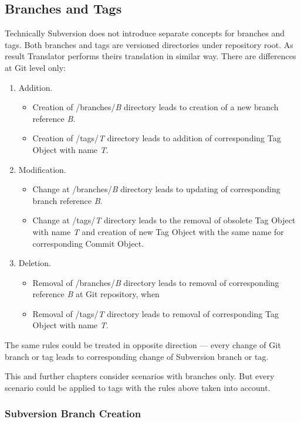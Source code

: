 \subsection{Branches and Tags}

Technically Subversion does not introduce separate concepts for branches and tags. Both branches and tags are versioned directories under repository root. As result Translator performs theirs translation in similar way. There are differences at Git level only:
\begin{enumerate}
	\compactlist
	\item Addition.
	\begin{itemize}
		\item Creation of /branches/\emph{B} directory leads to creation of a new branch reference \emph{B}.
		\item Creation of /tags/\emph{T} directory leads to addition of corresponding Tag Object with name \emph{T}.
	\end{itemize}
	\item Modification.
	\begin{itemize}
		\item Change at /branches/\emph{B} directory leads to updating of corresponding branch reference \emph{B}.
		\item Change at /tags/\emph{T} directory leads to the removal of obsolete Tag Object with name \emph{T} and creation of new Tag Object with the same name for corresponding Commit Object.
	\end{itemize}
	\item Deletion.
	\begin{itemize}
		\item Removal of /branches/\emph{B} directory leads to removal of corresponding reference \emph{B} at Git repository, when
		\item Removal of /tags/\emph{T} directory leads to removal of corresponding Tag Object with name \emph{T}.
	\end{itemize}
\end{enumerate}

The same rules could be treated in opposite direction --- every change of Git branch or tag leads to corresponding change of Subversion branch or tag.

This and further chapters consider scenarios with branches only. But every scenario could be applied to tags with the rules above taken into account.

\subsubsection{Subversion Branch Creation}


